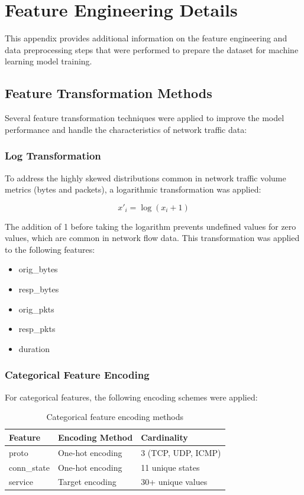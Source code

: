 \chapter{Feature Engineering Details}

This appendix provides additional information on the feature engineering and data preprocessing steps that were performed to prepare the dataset for machine learning model training.

\section{Feature Transformation Methods}

Several feature transformation techniques were applied to improve the model performance and handle the characteristics of network traffic data:

\subsection{Log Transformation}

To address the highly skewed distributions common in network traffic volume metrics (bytes and packets), a logarithmic transformation was applied:

\begin{equation}
x'_i = \log(x_i + 1)
\end{equation}

The addition of 1 before taking the logarithm prevents undefined values for zero values, which are common in network flow data. This transformation was applied to the following features:
\begin{itemize}
    \item orig\_bytes
    \item resp\_bytes
    \item orig\_pkts
    \item resp\_pkts
    \item duration
\end{itemize}

\subsection{Categorical Feature Encoding}

For categorical features, the following encoding schemes were applied:

\begin{table}[h]
\centering
\caption{Categorical feature encoding methods}
\label{tab:categorical_encoding}
\begin{tabular}{lll}
\hline
\textbf{Feature} & \textbf{Encoding Method} & \textbf{Cardinality} \\
\hline
proto & One-hot encoding & 3 (TCP, UDP, ICMP) \\
conn\_state & One-hot encoding & 11 unique states \\
service & Target encoding & 30+ unique values \\
\hline
\end{tabular}
\end{table}

